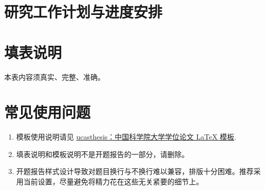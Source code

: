 \section{研究工作计划与进度安排}



\section*{填表说明}

本表内容须真实、完整、准确。

\section*{常见使用问题}

\begin{enumerate}
    \item 模板使用说明请见 \href{https://github.com/mohuangrui/ucasthesis}{ucasthesis：中国科学院大学学位论文 LaTeX 模板}.
    \item 填表说明和模板说明不是开题报告的一部分，请删除。
    \item 开题报告样式设计导致对题目换行与不换行难以兼容，排版十分困难。推荐采用当前设置，尽量避免将精力花在这些无关紧要的细节上。
\end{enumerate}

\nocite{*}%
